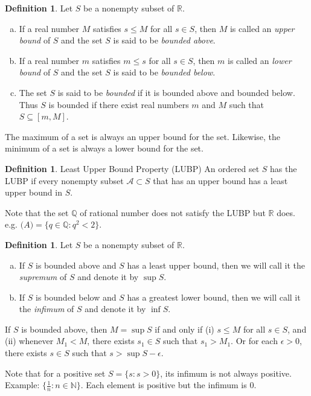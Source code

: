 \documentclass[12pt, lettersize]{book}
\theoremstyle{plain}
\theoremstyle{definition}
\newtheorem{dfn}[thm]{Definition}
\theoremstyle{remark}
\newcommand{\R}{\mathbb{R}}
\newcommand{\N}{\mathbb{N}}
\newcommand{\Q}{\mathbb{Q}}
\begin{document}
		\begin{dfn}\label{def:4.2}
		Let $S$ be a nonempty subset of $\R$.
		\begin{enumerate}[(a)]
			\item If a real number $M$ satisfies $s\leq M$ for all $s\in S$, then $M$ is called an \emph{upper bound} of $S$ and the set $S$ is said to be \emph{bounded above}.
			\item If a real number $m$ satisfies $m\leq s$ for all $s\in S$, then $m$ is called an \emph{lower bound} of $S$ and the set $S$ is said to be \emph{bounded below}.
			\item The set $S$ is said to be \emph{bounded} if it is bounded above and bounded below. Thus $S$ is bounded if there exist real numbers $m$ and $M$ such that $S\subseteq[m,M]$.
		\end{enumerate}
		\end{dfn}
		The maximum of a set is always an upper bound for the set. Likewise, the minimum of a set is always a lower bound for the set.
	
		\begin{dfn}
		Least Upper Bound Property (LUBP)\newline
		An ordered set $S$ has the LUBP if every nonempty subset $\mathcal{A}\subset S$ that has an upper bound has a least upper bound in $S$.
		\end{dfn}
		Note that the set $\Q$ of rational number does not satisfy the LUBP but $\R$ does. e.g. $\mathcal(A)=\{q\in\Q: q^2<2\}$.
			
		\begin{dfn}\label{def:4.3}
		Let $S$ be a nonempty subset of $\R$.
		\begin{enumerate}[(a)]
			\item If $S$ is bounded above and $S$ has a least upper bound, then we will call it the \emph{supremum} of $S$ and denote it by $\sup S$.
			\item If $S$ is bounded below and $S$ has a greatest lower bound, then we will call it the \emph{infimum} of $S$ and denote it by $\inf S$.
		\end{enumerate}
		\end{dfn}
		If $S$ is bounded above, then $M=\sup S$ if and only if (i) $s\leq M$ for all $s\in S$, and (ii) whenever $M_1<M$, there exists $s_1\in S$ such that $s_1>M_1$. Or for each $\epsilon>0$, there exists $s\in S$ such that $s>\sup S-\epsilon$.
		
		Note that for a positive set $S=\{s: s>0\}$, its infimum is not always positive. Example: $\{\frac{1}{n}: n\in\N\}$. Each element is positive but the infimum is $0$.
		
\end{document}
